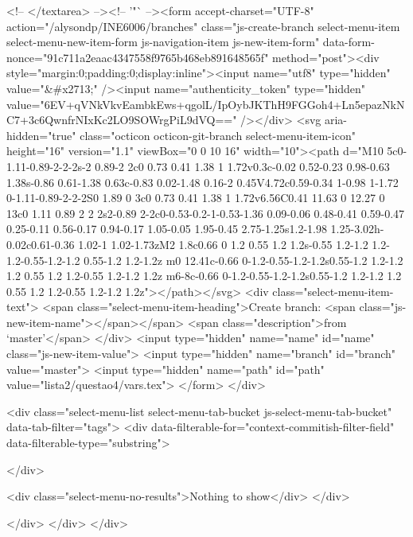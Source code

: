           <!-- </textarea> --><!-- '"` --><form accept-charset="UTF-8" action="/alysondp/INE6006/branches" class="js-create-branch select-menu-item select-menu-new-item-form js-navigation-item js-new-item-form" data-form-nonce="91c711a2eaac4347558f9765b468eb891648565f" method="post"><div style="margin:0;padding:0;display:inline"><input name="utf8" type="hidden" value="&#x2713;" /><input name="authenticity_token" type="hidden" value="6EV+qVNkVkvEambkEws+qgolL/IpOybJKThH9FGGoh4+Ln5epazNkNC7+3c6QwnfrNIxKc2LO9SOWrgPiL9dVQ==" /></div>
          <svg aria-hidden="true" class="octicon octicon-git-branch select-menu-item-icon" height="16" version="1.1" viewBox="0 0 10 16" width="10"><path d="M10 5c0-1.11-0.89-2-2-2s-2 0.89-2 2c0 0.73 0.41 1.38 1 1.72v0.3c-0.02 0.52-0.23 0.98-0.63 1.38s-0.86 0.61-1.38 0.63c-0.83 0.02-1.48 0.16-2 0.45V4.72c0.59-0.34 1-0.98 1-1.72 0-1.11-0.89-2-2-2S0 1.89 0 3c0 0.73 0.41 1.38 1 1.72v6.56C0.41 11.63 0 12.27 0 13c0 1.11 0.89 2 2 2s2-0.89 2-2c0-0.53-0.2-1-0.53-1.36 0.09-0.06 0.48-0.41 0.59-0.47 0.25-0.11 0.56-0.17 0.94-0.17 1.05-0.05 1.95-0.45 2.75-1.25s1.2-1.98 1.25-3.02h-0.02c0.61-0.36 1.02-1 1.02-1.73zM2 1.8c0.66 0 1.2 0.55 1.2 1.2s-0.55 1.2-1.2 1.2-1.2-0.55-1.2-1.2 0.55-1.2 1.2-1.2z m0 12.41c-0.66 0-1.2-0.55-1.2-1.2s0.55-1.2 1.2-1.2 1.2 0.55 1.2 1.2-0.55 1.2-1.2 1.2z m6-8c-0.66 0-1.2-0.55-1.2-1.2s0.55-1.2 1.2-1.2 1.2 0.55 1.2 1.2-0.55 1.2-1.2 1.2z"></path></svg>
            <div class="select-menu-item-text">
              <span class="select-menu-item-heading">Create branch: <span class="js-new-item-name"></span></span>
              <span class="description">from ‘master’</span>
            </div>
            <input type="hidden" name="name" id="name" class="js-new-item-value">
            <input type="hidden" name="branch" id="branch" value="master">
            <input type="hidden" name="path" id="path" value="lista2/questao4/vars.tex">
</form>
      </div>

      <div class="select-menu-list select-menu-tab-bucket js-select-menu-tab-bucket" data-tab-filter="tags">
        <div data-filterable-for="context-commitish-filter-field" data-filterable-type="substring">


        </div>

        <div class="select-menu-no-results">Nothing to show</div>
      </div>

    </div>
  </div>
</div>

